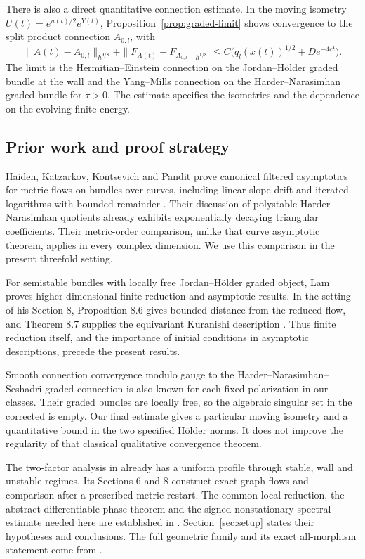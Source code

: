 \documentclass[11pt]{amsart}
\theoremstyle{definition}
\theoremstyle{remark}
\begin{document}
There is also a direct quantitative connection estimate.
In the moving isometry
$U(t)=e^{u(t)/2}e^{Y(t)}$, Proposition~\ref{prop:graded-limit}
shows convergence to the split product connection $A_{0,l}$,
with
\[
 \|A(t)-A_{0,l}\|_{h^{9/8}}
 +\|F_{A(t)}-F_{A_{0,l}}\|_{h^{1/8}}
       \le C\bigl(q_l(x(t))^{1/2}+De^{-4ct}\bigr).
\]
The limit is the Hermitian--Einstein connection on the
Jordan--Hölder graded bundle at the wall and the Yang--Mills
connection on the Harder--Narasimhan graded bundle for
$\tau>0$. The estimate specifies the isometries and the
dependence on the evolving finite energy.

\subsection{Prior work and proof strategy}
Haiden, Katzarkov, Kontsevich and Pandit prove canonical
filtered asymptotics for metric flows on bundles over
curves, including linear slope drift and iterated logarithms
with bounded remainder \cite[Theorem 1.1 and Section 4.3]{HKKP18}.
Their discussion of polystable Harder--Narasimhan quotients
already exhibits exponentially decaying triangular coefficients.
Their metric-order comparison, unlike that curve asymptotic
theorem, applies in every complex dimension. We use this
comparison in the present threefold setting.

For semistable bundles with locally free Jordan--Hölder graded
object, Lam proves higher-dimensional finite-reduction and
asymptotic results. In the setting of his Section 8,
Proposition 8.6 gives bounded distance from the reduced flow,
and Theorem 8.7 supplies the equivariant Kuranishi description
\cite{Lam26}. Thus finite reduction itself, and the importance
of initial conditions in asymptotic descriptions, precede
the present results.

Smooth connection convergence modulo gauge to the
Harder--Narasimhan--Seshadri graded connection is also known
for each fixed polarization in our classes. Their graded
bundles are locally free, so the algebraic singular set in
the corrected \cite[Theorem 1.1(2)]{SibleyWentworth15} is empty.
Our final estimate gives a particular moving isometry and
a quantitative bound in the two specified Hölder norms.
It does not improve the regularity of that classical
qualitative convergence theorem.

The two-factor analysis in \cite[Theorem 5.4]{WuebbenFlow26}
already has a uniform profile through stable, wall and
unstable regimes. Its Sections 6 and 8 construct exact graph
flows and comparison after a prescribed-metric restart.
The common local reduction, the abstract differentiable
phase theorem and the signed nonstationary spectral estimate
needed here are established in \cite{WuebbenPhase26}.
Section~\ref{sec:setup} states their hypotheses and conclusions.
The full geometric family and its exact all-morphism statement
come from \cite[Sections 6 and 9]{WuebbenWall26}.
\end{document}
